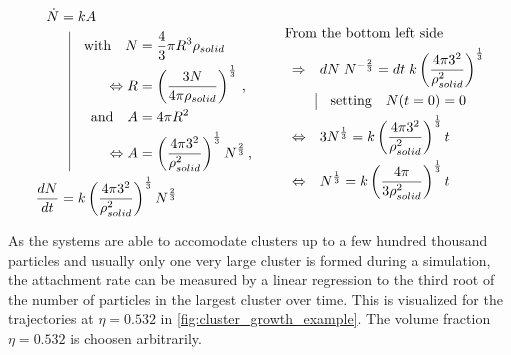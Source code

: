 \begin{align}
\label{eqn:constant_growth}  
\begin{split}
\dot{N} &= k A \\
          & \; \; \, \vrule
  \begin{aligned}[t]
    \quad \text{with}  \quad  N &= \frac{4}{3} \pi R^3 \rho_{solid}\\
    \Leftrightarrow R &= \left( \frac{3 N }{4 \pi \rho_{solid} }\right)^{\frac{1}{3}} \, \text{,} \\
    \quad \text{and}   \quad A &= 4 \pi R^2 \\
    \Leftrightarrow A &= \left(\frac{4 \pi 3^2 }{\rho_{solid}^2} \right)^\frac{1}{3} N^\frac{2}{3} \, \text{,}\\
  \end{aligned}\\
\frac{dN}{dt} &= k \left(\frac{4 \pi 3^2 }{\rho_{solid}^2} \right)^\frac{1}{3}  N^\frac{2}{3}\\
\end{split}
\hspace{1cm}
\begin{split}
& \!\!\!\!\!\!\!\!\! \text{From the bottom left side}\\
\Rightarrow& \quad dN \; N^{-\frac{2}{3}} = dt \; k \left(\frac{4 \pi 3^2 }{\rho_{solid}^2} \right)^\frac{1}{3}\\
          & \; \; \, \vrule
  \begin{aligned}[t]
    \quad \text{setting}  \quad  N(t=0) = 0\\
  \end{aligned}\\
\Leftrightarrow& \quad 3 N^{\frac{1}{3}} = k \left(\frac{4 \pi 3^2 }{\rho_{solid}^2} \right)^\frac{1}{3} t\\
\Leftrightarrow&  \quad N^{\frac{1}{3}} = k \left( \frac{4 \pi}{3 \rho_{solid}^2} \right)^\frac{1}{3} t
\end{split}
\end{align}  

As the systems are able to accomodate clusters up to a few hundred thousand particles and usually only one very large cluster is formed during a simulation, the attachment rate can be measured by a linear regression to the third root of the number of particles in the largest cluster over time. This is visualized for the trajectories at $\eta=0.532$ in \autoref{fig:cluster_growth_example}. The volume fraction $\eta=0.532$ is choosen arbitrarily.



